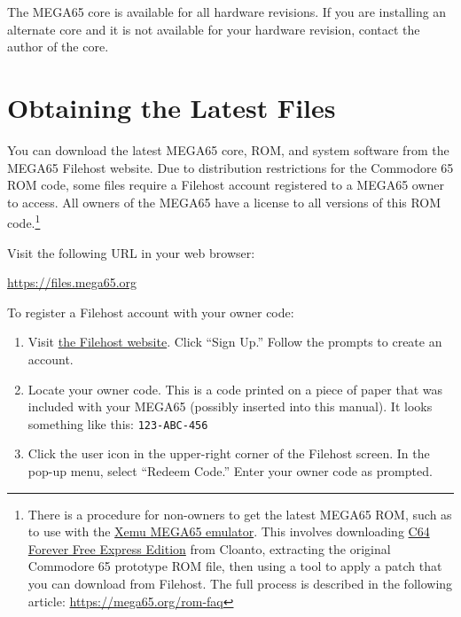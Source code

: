 The MEGA65 core is available for all hardware revisions. If you are installing an alternate core and it is not available for your hardware revision, contact the author of the core.

\section{Obtaining the Latest Files}

You can download the latest MEGA65 core, ROM, and system software from the MEGA65 Filehost website. Due to distribution restrictions for the Commodore 65 ROM code, some files require a Filehost account registered to a MEGA65 owner to access. All owners of the MEGA65 have a license to all versions of this ROM code.\footnote{There is a procedure for non-owners to get the latest MEGA65 ROM, such as to use with the \href{https://github.lgb.hu/xemu/}{Xemu MEGA65 emulator}. This involves downloading \href{https://www.c64forever.com/}{C64 Forever Free Express Edition} from Cloanto, extracting the original Commodore 65 prototype ROM file, then using a tool to apply a patch that you can download from Filehost. The full process is described in the following article: \url{https://mega65.org/rom-faq}}

Visit the following URL in your web browser:

\url{https://files.mega65.org}

\begin{center}
\end{center}

To register a Filehost account with your owner code:

\begin{enumerate}
  \item Visit \href{https://files.mega65.org}{the Filehost website}. Click ``Sign Up.'' Follow the prompts to create an account.
  \item Locate your owner code. This is a code printed on a piece of paper that was included with your MEGA65 (possibly inserted into this manual). It looks something like this: {\tt 123-ABC-456}
  \item Click the user icon in the upper-right corner of the Filehost screen. In the pop-up menu, select ``Redeem Code.'' Enter your owner code as prompted.
\end{enumerate}

